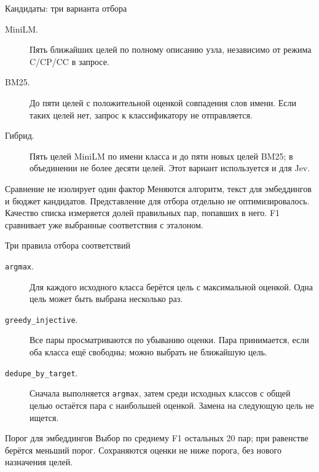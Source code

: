 \documentclass[aspectratio=169,11pt]{beamer}
\begin{document}
\renewcommand{\hseheadertext}{Дополнительные материалы}
\begin{frame}{Кандидаты: три варианта отбора}
  \begin{description}
    \item[MiniLM.] Пять ближайших целей по полному описанию узла,
      независимо от режима C/CP/CC в запросе.
    \item[BM25.] До пяти целей с положительной оценкой совпадения слов имени.
      Если таких целей нет, запрос к классификатору не отправляется.
    \item[Гибрид.] Пять целей MiniLM по имени класса и до пяти новых целей BM25;
      в объединении не более десяти целей. Этот вариант используется и для Jev.
  \end{description}
  \begin{alertblock}{Сравнение не изолирует один фактор}
    Меняются алгоритм, текст для эмбеддингов и бюджет кандидатов.
    Представление для отбора отдельно не оптимизировалось.
    Качество списка измеряется долей правильных пар, попавших в него.
    F1 сравнивает уже выбранные соответствия с эталоном.
  \end{alertblock}
\end{frame}

\renewcommand{\hseheadertext}{Дополнительные материалы}
\begin{frame}{Три правила отбора соответствий}
  \begin{description}
    \item[\texttt{argmax}.] Для каждого исходного класса берётся цель с максимальной оценкой.
      Одна цель может быть выбрана несколько раз.
    \item[\texttt{greedy\_injective}.] Все пары просматриваются по убыванию оценки.
      Пара принимается, если оба класса ещё свободны; можно выбрать не ближайшую цель.
    \item[\texttt{dedupe\_by\_target}.] Сначала выполняется \texttt{argmax},
      затем среди исходных классов с общей целью остаётся пара с наибольшей оценкой.
      Замена на следующую цель не ищется.
  \end{description}
  \begin{block}{Порог для эмбеддингов}
    Выбор по среднему F1 остальных 20 пар; при равенстве берётся меньший порог.
    Сохраняются оценки не ниже порога, без нового назначения целей.
  \end{block}
\end{frame}
\end{document}
